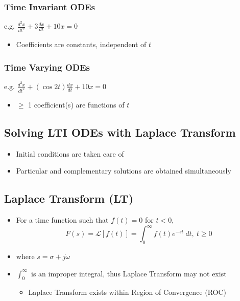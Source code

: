 \documentclass[a4paper]{article}
\begin{document}
\subsubsection{Time Invariant ODEs}
\begin{center}
    e.g. $\displaystyle \frac{d^2 x}{dt^2}+3\frac{dx}{dt}+10x = 0$
\end{center}
\begin{itemize}
    \item Coefficients are constants, independent of $t$
\end{itemize}
\subsubsection{Time Varying ODEs}
\begin{center}
    e.g. $\displaystyle \frac{d^2 x}{dt^2}+(\cos 2t)\frac{dx}{dt} + 10x = 0$
\end{center}
\begin{itemize}
    \item $\geq$ 1 coefficient(s) are functions of $t$
\end{itemize}
\subsection{Solving LTI ODEs with Laplace Transform}
\begin{itemize}
    \item Initial conditions are taken care of
    \item Particular and complementary solutions are obtained simultaneously
\end{itemize}
\subsection{Laplace Transform (LT)}
\begin{itemize}
    \item For a time function such that $f(t) = 0$ for $t < 0$,
    $$F(s) = \mathscr{L}[f(t)] = \int_{0}^{\infty}f(t)e^{-st}\ dt, \ t\geq 0$$
    \item where $s=\sigma +j\omega$
    \item $\displaystyle \int_0^\infty$ is an improper integral, thus Laplace Transform may not exist
    \begin{itemize}[label=$\circ$]
        \item Laplace Transform exists within Region of Convergence (ROC)
    \end{itemize}
\end{itemize}
\end{document}
